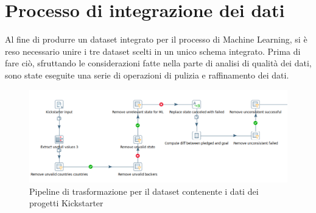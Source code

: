 \section{Processo di integrazione dei dati}
Al fine di produrre un dataset integrato per il processo di Machine Learning, si è reso necessario unire i tre dataset scelti in un unico schema integrato. Prima di fare ciò, sfruttando le considerazioni fatte nella parte di analisi di qualità dei dati, sono state eseguite una serie di operazioni di pulizia e raffinamento dei dati.\\

\begin{figure}
	\hspace*{-1cm}%
	\includegraphics[width=\dimexpr\textwidth+2cm\relax]{images/transformation_kick}%
	\hspace*{-1cm}%
	\caption{Pipeline di trasformazione per il dataset contenente i dati dei progetti Kickstarter}
	\label{fig:transformationkick}
\end{figure}

